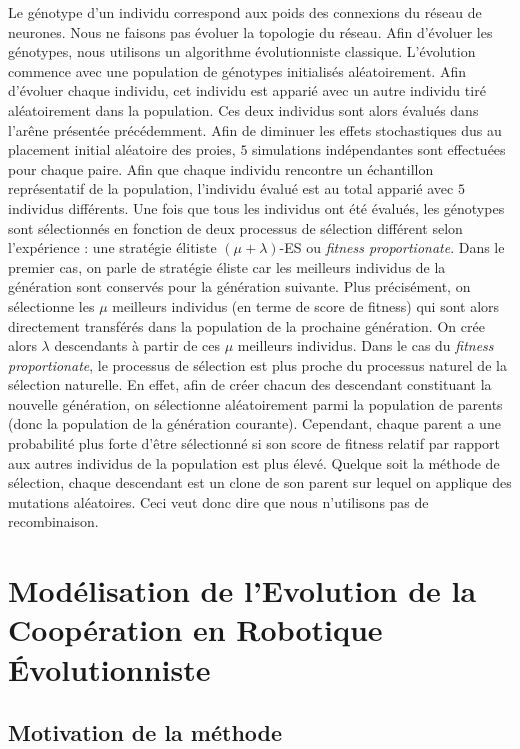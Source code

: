    	Le génotype d'un individu correspond aux poids des connexions du réseau de neurones. Nous ne faisons pas évoluer la topologie du réseau. Afin d'évoluer les génotypes, nous utilisons un algorithme évolutionniste classique. L'évolution commence avec une population de génotypes initialisés aléatoirement. Afin d'évoluer chaque individu, cet individu est apparié avec un autre individu tiré aléatoirement dans la population. Ces deux individus sont alors évalués dans l'arêne présentée précédemment. Afin de diminuer les effets stochastiques dus au placement initial aléatoire des proies, $5$ simulations indépendantes sont effectuées pour chaque paire. Afin que chaque individu rencontre un échantillon représentatif de la population, l'individu évalué est au total apparié avec $5$ individus différents. Une fois que tous les individus ont été évalués, les génotypes sont sélectionnés en fonction de deux processus de sélection différent selon l'expérience : une stratégie élitiste \((\mu+\lambda)\)-ES ou \emph{fitness proportionate}. Dans le premier cas, on parle de stratégie éliste car les meilleurs individus de la génération sont conservés pour la génération suivante. Plus précisément, on sélectionne les $\mu$ meilleurs individus (en terme de score de fitness) qui sont alors directement transférés dans la population de la prochaine génération. On crée alors $\lambda$ descendants à partir de ces $\mu$ meilleurs individus. Dans le cas du \emph{fitness proportionate}, le processus de sélection est plus proche du processus naturel de la sélection naturelle. En effet, afin de créer chacun des descendant constituant la nouvelle génération, on sélectionne aléatoirement parmi la population de parents (donc la population de la génération courante). Cependant, chaque parent a une probabilité plus forte d'être sélectionné si son score de fitness relatif par rapport aux autres individus de la population est plus élevé. Quelque soit la méthode de sélection, chaque descendant est un clone de son parent sur lequel on applique des mutations aléatoires. Ceci veut donc dire que nous n'utilisons pas de recombinaison.


\section{Modélisation de l'Evolution de la Coopération en Robotique Évolutionniste}

	\subsection{Motivation de la méthode}
	
